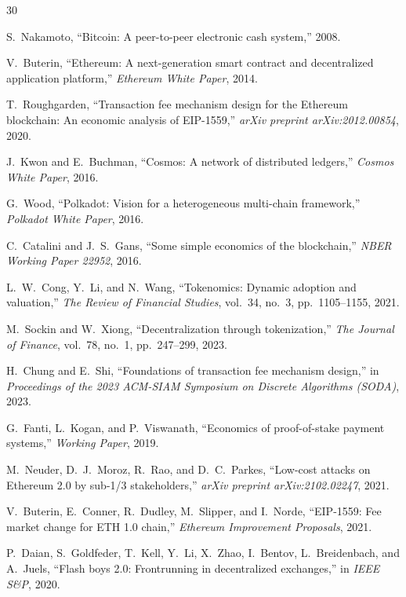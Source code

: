 \documentclass[11pt,a4paper]{article}
\begin{document}

\begin{thebibliography}{30}

S.~Nakamoto, ``Bitcoin: A peer-to-peer electronic cash system,'' 2008.

V.~Buterin, ``Ethereum: A next-generation smart contract and decentralized application platform,'' \emph{Ethereum White Paper}, 2014.

T.~Roughgarden, ``Transaction fee mechanism design for the Ethereum blockchain: An economic analysis of EIP-1559,'' \emph{arXiv preprint arXiv:2012.00854}, 2020.

J.~Kwon and E.~Buchman, ``Cosmos: A network of distributed ledgers,'' \emph{Cosmos White Paper}, 2016.

G.~Wood, ``Polkadot: Vision for a heterogeneous multi-chain framework,'' \emph{Polkadot White Paper}, 2016.

C.~Catalini and J.~S.~Gans, ``Some simple economics of the blockchain,'' \emph{NBER Working Paper 22952}, 2016.

L.~W.~Cong, Y.~Li, and N.~Wang, ``Tokenomics: Dynamic adoption and valuation,'' \emph{The Review of Financial Studies}, vol.~34, no.~3, pp.~1105--1155, 2021.

M.~Sockin and W.~Xiong, ``Decentralization through tokenization,'' \emph{The Journal of Finance}, vol.~78, no.~1, pp.~247--299, 2023.

H.~Chung and E.~Shi, ``Foundations of transaction fee mechanism design,'' in \emph{Proceedings of the 2023 ACM-SIAM Symposium on Discrete Algorithms (SODA)}, 2023.

G.~Fanti, L.~Kogan, and P.~Viswanath, ``Economics of proof-of-stake payment systems,'' \emph{Working Paper}, 2019.

M.~Neuder, D.~J.~Moroz, R.~Rao, and D.~C.~Parkes, ``Low-cost attacks on Ethereum 2.0 by sub-1/3 stakeholders,'' \emph{arXiv preprint arXiv:2102.02247}, 2021.

V.~Buterin, E.~Conner, R.~Dudley, M.~Slipper, and I.~Norde, ``EIP-1559: Fee market change for ETH 1.0 chain,'' \emph{Ethereum Improvement Proposals}, 2021.

P.~Daian, S.~Goldfeder, T.~Kell, Y.~Li, X.~Zhao, I.~Bentov, L.~Breidenbach, and A.~Juels, ``Flash boys 2.0: Frontrunning in decentralized exchanges,'' in \emph{IEEE S\&P}, 2020.


\end{thebibliography}
\end{document}
